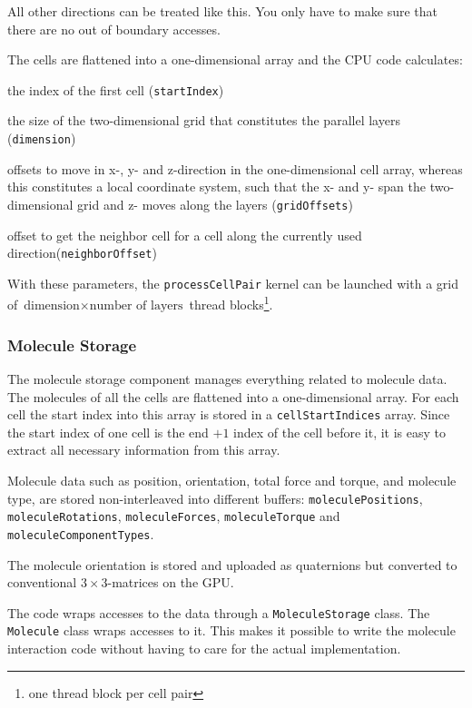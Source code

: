 All other directions can be treated like this. You only have to make sure that there are no out of boundary accesses.

The cells are flattened into a one-dimensional array and the CPU code calculates:
\begin{compactitem}
\item the index of the first cell (\lstinline!startIndex!)
\item the size of the two-dimensional grid that constitutes the parallel layers (\lstinline!dimension!)
\item offsets to move in x-, y- and z-direction in the one-dimensional cell array, whereas this constitutes a local coordinate system, such that the x- and y- span the two-dimensional grid and z- moves along the layers (\lstinline!gridOffsets!)
\item offset to get the neighbor cell for a cell along the currently used direction(\lstinline!neighborOffset!)
\end{compactitem}
With these parameters, the \lstinline!processCellPair! kernel can be launched with a grid of $ \text{dimension} \times \text{number of layers} $ thread blocks\footnote{one thread block per cell pair}.

\subsubsection{Molecule Storage}
The molecule storage component manages everything related to molecule data. The molecules of all the cells are flattened into a one-dimensional array. For each cell the start index into this array is stored in a \lstinline!cellStartIndices! array. Since the start index of one cell is the end $ + 1 $ index of the cell before it, it is easy to extract all necessary information from this array.

Molecule data such as position, orientation, total force and torque, and molecule type, are stored non-interleaved into different buffers: \lstinline!moleculePositions!, \lstinline!moleculeRotations!, \lstinline!moleculeForces!, \lstinline!moleculeTorque! and \lstinline!moleculeComponentTypes!.

The molecule orientation is stored and uploaded as quaternions but converted to conventional $ 3 \times 3 $-matrices on the GPU.

The \cuda{} code wraps accesses to the data through a \lstinline!MoleculeStorage! class. The \lstinline!Molecule! class wraps accesses to it. This makes it possible to write the molecule interaction code without having to care for the actual implementation.


